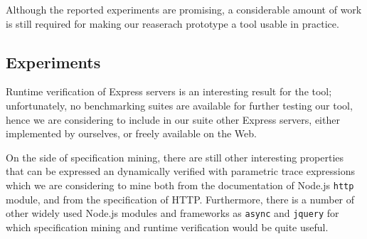 Although the reported experiments are promising, a considerable amount of work is still required for making our reaserach prototype a
tool usable in practice.

\subsection{Experiments}
Runtime verification of Express servers is an interesting result for the tool; unfortunately,
no benchmarking suites are available for further testing our tool, hence we are
considering to include in our suite other Express servers, either implemented by ourselves,
or freely available on the Web.

On the side of specification mining, there are still other interesting properties that can be expressed an dynamically
verified with parametric trace expressions which we are considering to mine both from the documentation of Node.js
\lstinline{http} module, and from the specification of HTTP. Furthermore, there is a number of other widely used Node.js
modules and frameworks as \lstinline{async} and \lstinline{jquery} for which specification mining and runtime
verification would be quite useful.



